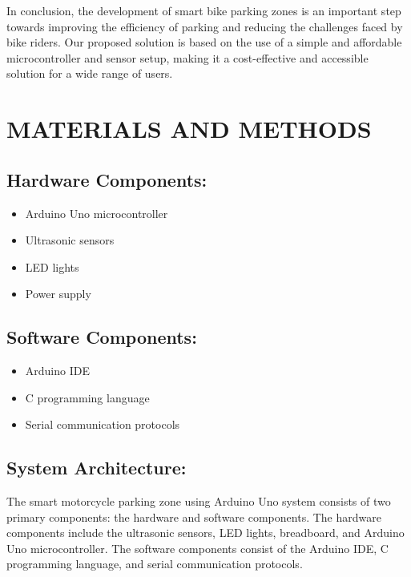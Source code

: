 \documentclass[conference]{IEEEtran}
\begin{document}
	In conclusion, the development of smart bike parking zones is an important step towards improving the efficiency of parking and reducing the challenges faced by bike riders. Our proposed solution is based on the use of a simple and affordable microcontroller and sensor setup, making it a cost-effective and accessible solution for a wide range of users.
	
	\section{MATERIALS AND METHODS}
	

	\subsection{Hardware Components:}

	\begin{itemize}
	\item Arduino Uno microcontroller
	\item Ultrasonic sensors
	\item LED lights
	\item Power supply
	\end{itemize}
	
	\subsection{Software Components:}
	
	\begin{itemize}
		\item Arduino IDE
		\item C programming language
		\item Serial communication protocols
	\end{itemize}

	\subsection{System Architecture:}
	The smart motorcycle parking zone using Arduino Uno system consists of two primary components: the hardware and software components. The hardware components include the ultrasonic sensors, LED lights, breadboard, and Arduino Uno microcontroller. The software components consist of the Arduino IDE, C programming language, and serial communication protocols.
\end{document}
